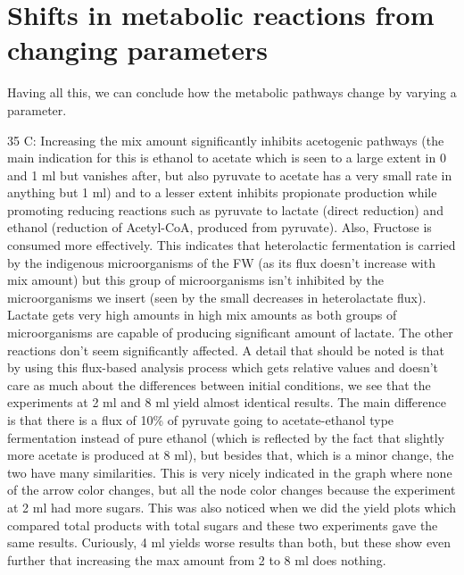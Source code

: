 \documentclass[11pt]{article}
\begin{document}
\section{Shifts in metabolic reactions from changing parameters}
\label{sec:orgc23dbb5}
Having all this, we can conclude how the metabolic pathways change by varying a parameter.

35 C: Increasing the mix amount significantly inhibits acetogenic pathways (the main indication for this is ethanol to acetate which is seen to a large extent in 0 and 1 ml but vanishes after, but also pyruvate to acetate has a very small rate in anything but 1 ml) and to a lesser extent inhibits propionate production while promoting reducing reactions such as pyruvate to lactate (direct reduction) and ethanol (reduction of Acetyl-CoA, produced from pyruvate). Also, Fructose is consumed more effectively. This indicates that heterolactic fermentation is carried by the indigenous microorganisms of the FW (as its flux doesn't increase with mix amount) but this group of microorganisms isn't inhibited by the microorganisms we insert (seen by the small decreases in heterolactate flux). Lactate gets very high amounts in high mix amounts as both groups of microorganisms are capable of producing significant amount of lactate. The other reactions don't seem significantly affected. A detail that should be noted is that by using this flux-based analysis process which gets relative values and doesn't care as much about the differences between initial conditions, we see that the experiments at 2 ml and 8 ml yield almost identical results. The main difference is that there is a flux of 10\% of pyruvate going to acetate-ethanol type fermentation instead of pure ethanol (which is reflected by the fact that slightly more acetate is produced at 8 ml), but besides that, which is a minor change, the two have many similarities. This is very nicely indicated in the graph where none of the arrow color changes, but all the node color changes because the experiment at 2 ml had more sugars. This was also noticed when we did the yield plots which compared total products with total sugars and these two experiments gave the same results. Curiously, 4 ml yields worse results than both, but these show even further that increasing the max amount from 2 to 8 ml does nothing.
\end{document}
